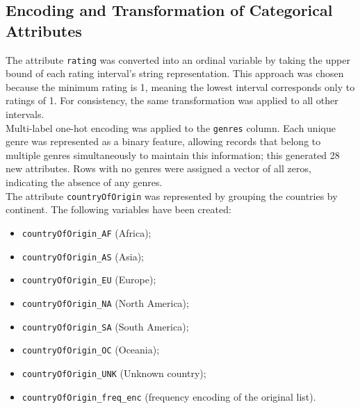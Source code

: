 \subsection{Encoding and Transformation of Categorical Attributes}
The attribute \texttt{rating} was converted into an ordinal variable by taking the upper bound of each rating
interval's string representation. This approach was chosen because the minimum rating is 1, meaning the
lowest interval corresponds only to ratings of 1. For consistency, the same transformation was applied
to all other intervals.\\

Multi-label one-hot encoding was applied to the \texttt{genres} column. 
Each unique genre was represented as a binary feature, allowing records that belong to multiple genres simultaneously to maintain this information; this generated 28 new attributes.
Rows with no genres were assigned a vector of all zeros, indicating the absence of any genres.\\

The attribute \texttt{countryOfOrigin} was represented by grouping the countries by continent.
The following variables have been created: 
\begin{multicols}{2}
    \begin{itemize}
        \item \texttt{countryOfOrigin\_AF} (Africa);
        \item \texttt{countryOfOrigin\_AS} (Asia);
        \item \texttt{countryOfOrigin\_EU} (Europe);
        \item \texttt{countryOfOrigin\_NA} (North America);
        \item \texttt{countryOfOrigin\_SA} (South America);
        \item \texttt{countryOfOrigin\_OC} (Oceania);
        \item \texttt{countryOfOrigin\_UNK} (Unknown country);
        \item \texttt{countryOfOrigin\_freq\_enc} (frequency encoding of the original list).
    \end{itemize}
\end{multicols}


